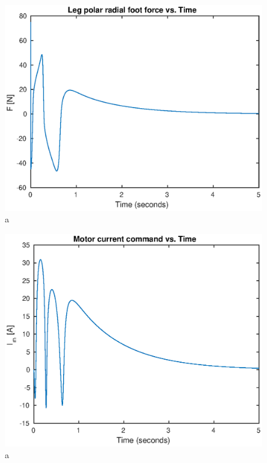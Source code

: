 \begin{figure}
\centering
\includegraphics[width=1\textwidth]{images/simulation/f.eps}
\caption{a}
\label{fig:a}
\end{figure}

\begin{figure}
\centering
\includegraphics[width=1\textwidth]{images/simulation/im.eps}
\caption{a}
\label{fig:a}
\end{figure}